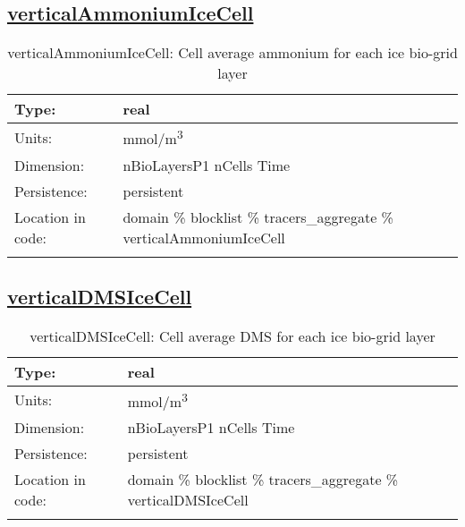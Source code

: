 \subsection[verticalAmmoniumIceCell]{\hyperref[sec:var_tab_tracers_aggregate]{verticalAmmoniumIceCell}}
\label{subsec:var_sec_tracers_aggregate_verticalAmmoniumIceCell}
\begin{center}
\begin{longtable}{| p{2.0in} | p{4.0in} |}
        \hline 
        Type: & real \\
        \hline 
        Units: & \si{mmol/m^3} \\
        \hline 
        Dimension: & nBioLayersP1 nCells Time \\
        \hline 
        Persistence: & persistent \\
        \hline 
         Location in code: & domain \% blocklist \% tracers\_aggregate \% verticalAmmoniumIceCell \\
         \hline 
    \caption{verticalAmmoniumIceCell: Cell average ammonium for each ice bio-grid layer}
\end{longtable}
\end{center}
\subsection[verticalDMSIceCell]{\hyperref[sec:var_tab_tracers_aggregate]{verticalDMSIceCell}}
\label{subsec:var_sec_tracers_aggregate_verticalDMSIceCell}
\begin{center}
\begin{longtable}{| p{2.0in} | p{4.0in} |}
        \hline 
        Type: & real \\
        \hline 
        Units: & \si{mmol/m^3} \\
        \hline 
        Dimension: & nBioLayersP1 nCells Time \\
        \hline 
        Persistence: & persistent \\
        \hline 
         Location in code: & domain \% blocklist \% tracers\_aggregate \% verticalDMSIceCell \\
         \hline 
    \caption{verticalDMSIceCell: Cell average DMS for each ice bio-grid layer}
\end{longtable}
\end{center}

